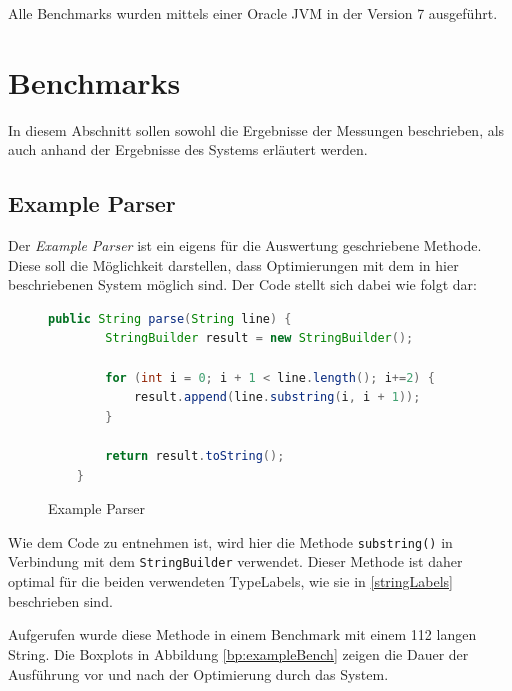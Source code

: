 Alle Benchmarks wurden mittels einer Oracle JVM in der Version 7 ausgeführt. 

\section{Benchmarks}

In diesem Abschnitt sollen sowohl die Ergebnisse der Messungen beschrieben, als auch 
anhand der Ergebnisse des Systems erläutert werden.

\subsection{Example Parser}

Der \textit{Example Parser} ist ein eigens für die Auswertung geschriebene Methode.
Diese soll die Möglichkeit darstellen, dass Optimierungen mit dem in hier beschriebenen
System möglich sind. Der Code stellt sich dabei wie folgt dar:

\begin{figure}[H]
	\begin{lstlisting}[language=Java]
	public String parse(String line) {
		StringBuilder result = new StringBuilder();

		for (int i = 0; i + 1 < line.length(); i+=2) {
			result.append(line.substring(i, i + 1));
		}

		return result.toString();
	}
	\end{lstlisting} 
	\caption{Example Parser}
\end{figure}

Wie dem Code zu entnehmen ist, wird hier die Methode \texttt{substring()} in 
Verbindung mit dem \texttt{StringBuilder} verwendet. Dieser Methode ist daher
optimal für die beiden verwendeten TypeLabels, wie sie in \ref{stringLabels} 
beschrieben sind. 

Aufgerufen wurde diese Methode in einem Benchmark mit einem 112 langen String. Die 
Boxplots in Abbildung \ref{bp:exampleBench} zeigen die Dauer der Ausführung
vor und nach der Optimierung durch das System. 

